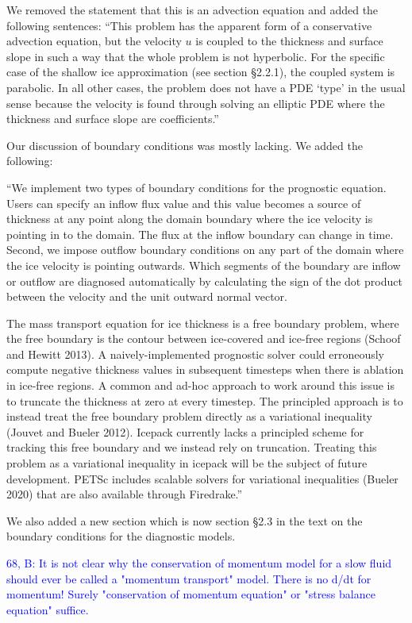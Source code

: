 \documentclass{article}
\theoremstyle{definition}
\theoremstyle{plain}
\begin{document}
We removed the statement that this is an advection equation and added the following sentences:
``This problem has the apparent form of a conservative advection equation, but the velocity $u$ is coupled to the thickness and surface slope in such a way that the whole problem is not hyperbolic.
For the specific case of the shallow ice approximation (see section \S2.2.1), the coupled system is parabolic.
In all other cases, the problem does not have a PDE `type' in the usual sense because the velocity is found through solving an elliptic PDE where the thickness and surface slope are coefficients.''

Our discussion of boundary conditions was mostly lacking.
We added the following:

``We implement two types of boundary conditions for the prognostic equation.
Users can specify an inflow flux value and this value becomes a source of thickness at any point along the domain boundary where the ice velocity is pointing in to the domain.
The flux at the inflow boundary can change in time.
Second, we impose outflow boundary conditions on any part of the domain where the ice velocity is pointing outwards.
Which segments of the boundary are inflow or outflow are diagnosed automatically by calculating the sign of the dot product between the velocity and the unit outward normal vector.

The mass transport equation for ice thickness is a free boundary problem, where the free boundary is the contour between ice-covered and ice-free regions (Schoof and Hewitt 2013).
A naively-implemented prognostic solver could erroneously compute negative thickness values in subsequent timesteps when there is ablation in ice-free regions.
A common and ad-hoc approach to work around this issue is to truncate the thickness at zero at every timestep.
The principled approach is to instead treat the free boundary problem directly as a variational inequality (Jouvet and Bueler 2012).
Icepack currently lacks a principled scheme for tracking this free boundary and we instead rely on truncation.
Treating this problem as a variational inequality in icepack will be the subject of future development.
PETSc includes scalable solvers for variational inequalities (Bueler 2020) that are also available through Firedrake.''

We also added a new section which is now section \S2.3 in the text on the boundary conditions for the diagnostic models.

\textcolor{blue}{68, B:  It is not clear why the conservation of momentum model for a slow fluid should ever be called a "momentum transport" model.  There is no d/dt for momentum!  Surely "conservation of momentum equation" or "stress balance equation" suffice.}
\end{document}

